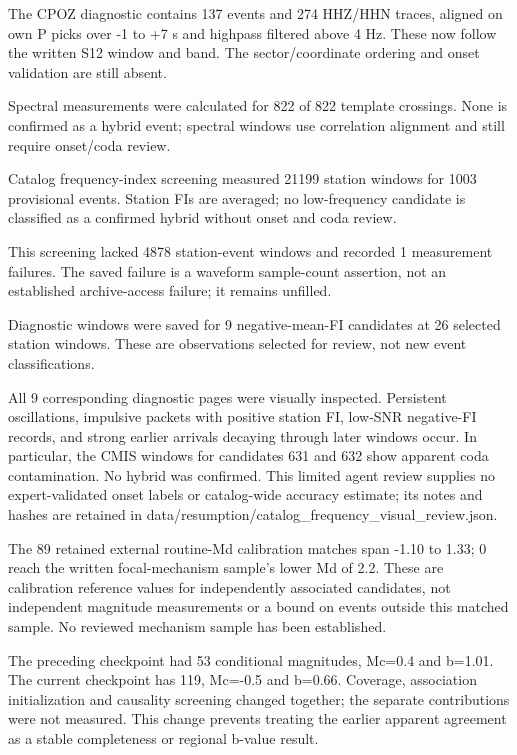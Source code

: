 The CPOZ diagnostic contains 137 events and 274 HHZ/HHN traces, aligned on own P picks over -1 to +7 s and highpass filtered above 4 Hz. These now follow the written S12 window and band. The sector/coordinate ordering and onset validation are still absent.

Spectral measurements were calculated for 822 of 822 template crossings. None is confirmed as a hybrid event; spectral windows use correlation alignment and still require onset/coda review.

Catalog frequency-index screening measured 21199 station windows for 1003 provisional events. Station FIs are averaged; no low-frequency candidate is classified as a confirmed hybrid without onset and coda review.

This screening lacked 4878 station-event windows and recorded 1 measurement failures. The saved failure is a waveform sample-count assertion, not an established archive-access failure; it remains unfilled.

Diagnostic windows were saved for 9 negative-mean-FI candidates at 26 selected station windows. These are observations selected for review, not new event classifications.

All 9 corresponding diagnostic pages were visually inspected. Persistent oscillations, impulsive packets with positive station FI, low-SNR negative-FI records, and strong earlier arrivals decaying through later windows occur. In particular, the CMIS windows for candidates 631 and 632 show apparent coda contamination. No hybrid was confirmed. This limited agent review supplies no expert-validated onset labels or catalog-wide accuracy estimate; its notes and hashes are retained in data/resumption/catalog\_frequency\_visual\_review.json.

The 89 retained external routine-Md calibration matches span -1.10 to 1.33; 0 reach the written focal-mechanism sample's lower Md of 2.2. These are calibration reference values for independently associated candidates, not independent magnitude measurements or a bound on events outside this matched sample. No reviewed mechanism sample has been established.

The preceding checkpoint had 53 conditional magnitudes, Mc=0.4 and b=1.01. The current checkpoint has 119, Mc=-0.5 and b=0.66. Coverage, association initialization and causality screening changed together; the separate contributions were not measured. This change prevents treating the earlier apparent agreement as a stable completeness or regional b-value result.


